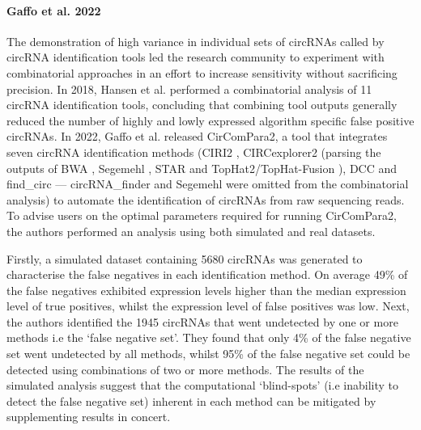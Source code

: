 \documentclass[pdflatex,sn-mathphys-num]{sn-jnl}
\begin{document}
\paragraph*{Gaffo et al. 2022}
The demonstration of high variance in individual sets of circRNAs called by circRNA identification tools \cite{Hansen2016Apr,Zeng2017Jun} led the research community to experiment with combinatorial approaches in an effort to increase sensitivity without sacrificing precision. In 2018, Hansen et al. \cite{Hansen2018} performed a combinatorial analysis of 11 circRNA identification tools, concluding that combining tool outputs generally reduced the number of highly and lowly expressed algorithm specific false positive circRNAs. In 2022, Gaffo et al. \cite{CirComPara2} released CirComPara2, a tool that integrates seven circRNA identification methods (CIRI2 \cite{CIRI2}, CIRCexplorer2 \cite{CIRCexplorer2} (parsing the outputs of BWA \cite{BWA}, Segemehl \cite{segemehl}, STAR \cite{STAR} and TopHat2/TopHat-Fusion \cite{TopHat2,TopHatFusion}), DCC \cite{DCC} and find\_circ \cite{find_circ} --- circRNA\_finder \cite{circRNA_finder} and Segemehl \cite{segemehl} were omitted from the combinatorial analysis) to automate the identification of circRNAs from raw sequencing reads. To advise users on the optimal parameters required for running CirComPara2, the authors performed an analysis using both simulated and real datasets. \par

Firstly, a simulated dataset containing 5680 circRNAs was generated to characterise the false negatives in each identification method. On average 49\% of the false negatives exhibited expression levels higher than the median expression level of true positives, whilst the expression level of false positives was low. Next, the authors identified the 1945 circRNAs that went undetected by one or more methods i.e the `false negative set'. They found that only 4\% of the false negative set went undetected by all methods, whilst 95\% of the false negative set could be detected using combinations of two or more methods. The results of the simulated analysis suggest that the computational `blind-spots' (i.e inability to detect the false negative set) inherent in each method can be mitigated by supplementing results in concert. \par
\end{document}
